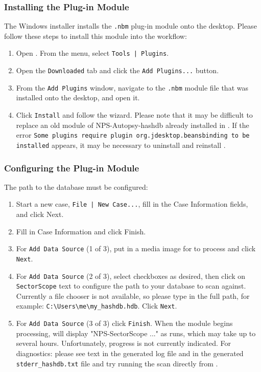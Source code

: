 \documentclass[11pt,fleqn]{article} %
\begin{document}
\subsubsection{Installing the \sscope \aut Plug-in Module}
\label{installingNBM}
The \sscope Windows installer installs the \verb+.nbm+ \sscope \aut plug-in module onto the desktop. Please follow these steps to install this module into the \aut workflow:
\begin{enumerate}
\item Open \aut. From the \aut menu, select \verb+Tools | Plugins+.
\item Open the \verb+Downloaded+ tab and click the \verb+Add Plugins...+ button.
\item From the \verb+Add Plugins+ window, navigate to the \verb+.nbm+ module file that was installed onto the desktop, and open it.
\item Click \verb+Install+ and follow the wizard. Please note that it may be difficult to replace an old module of NPS-Autopsy-hashdb already installed in \aut. If the error \verb+Some plugins require plugin org.jdesktop.beansbinding to be installed+ appears, it may be necessary to uninstall and reinstall \aut.
\end{enumerate}

\subsubsection{Configuring the \sscope \aut Plug-in Module}
\label{configuringNBM}
The path to the \hdb database must be configured:
\begin{enumerate}
\item Start a new case, \verb+File | New Case...+, fill in the Case Information fields, and click Next.
\item Fill in Case Information and click Finish.
\item For \verb+Add Data Source+ (1 of 3), put in a media image for \aut to process and click \verb+Next+.
\item For \verb+Add Data Source+ (2 of 3), select checkboxes as desired, then click on \verb+SectorScope+ text to configure the path to your \hdb database to scan against. Currently a file chooser is not available, so please type in the full path, for example: \verb+C:\Users\me\my_hashdb.hdb+. Click \verb+Next+.
\item For \verb+Add Data Source+ (3 of 3) click \verb+Finish+. When the \sscope module begins processing, \aut will display "NPS-SectorScope ..." as \hdb runs, which may take up to several hours. Unfortunately, \hdb progress is not currently indicated. For diagnostics: please see text in the generated log file and in the generated \verb+stderr_hashdb.txt+ file and try running the scan directly from \sscope.\\
\end{enumerate}
\end{document}
